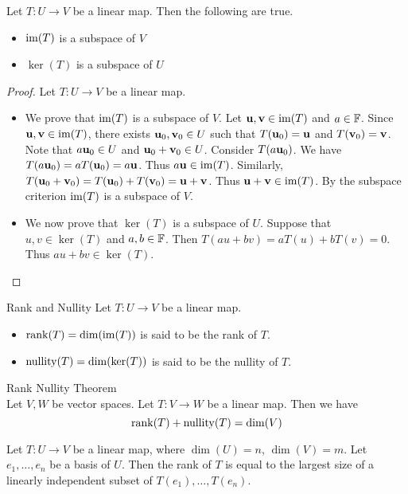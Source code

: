 \documentclass[a4paper]{article}
\begin{document}
\begin{prp}{}{} Let $T:U\to V$ be a linear map. Then the following are true. 
\begin{itemize}
\item $\operatorname{im}(T)$ is a subspace of $V$
\item $\ker(T)$ is a subspace of $U$
\end{itemize}
\begin{proof} Let $T:U\to V$ be a linear map. 
\begin{itemize}
\item We prove that $\operatorname{im}(T)$ is a subspace of $V$. Let $\vb{u},\vb{v}\in\operatorname{im}(T)$ and $a\in\mathbb{F}$. Since $\vb{u},\vb{v}\in\operatorname{im}(T)$, there exists $\vb{u}_0,\vb{v}_0\in U$ such that $T(\vb{u}_0)=\vb{u}$ and $T(\vb{v}_0)=\vb{v}$. Note that $a\vb{u}_0\in U$ and $\vb{u}_0+\vb{v}_0\in U$. Consider $T(a\vb{u}_0)$. We have $T(a\vb{u}_0)=aT(\vb{u}_0)=a\vb{u}$. Thus $a\vb{u}\in\operatorname{im}(T)$. Similarly, $T(\vb{u}_0+\vb{v}_0)=T(\vb{u}_0)+T(\vb{v}_0)=\vb{u}+\vb{v}$. Thus $\vb{u}+\vb{v}\in\operatorname{im}(T)$. By the subspace criterion $\operatorname{im}(T)$ is a subspace of $V$. 
\item We now prove that $\ker(T)$ is a subspace of $U$. Suppose that $u,v\in\ker(T)$ and $a,b\in\mathbb{F}$. Then $T(au+bv)=aT(u)+bT(v)=0$. Thus $au+bv\in\ker(T)$. 
\end{itemize}
\end{proof}
\end{prp}

\begin{defn}{Rank and Nullity}{} Let $T:U\to V$ be a linear map. 
\begin{itemize}
\item $\rank(T)=\dim(\operatorname{im}(T))$ is said to be the rank of $T$. 
\item $\operatorname{nullity}(T)=\dim(\ker(T))$ is said to be the nullity of $T$. 
\end{itemize}
\end{defn}

\begin{thm}{Rank Nullity Theorem}{}\\
Let $V,W$ be vector spaces. Let $T:V\to W$ be a linear map. Then we have $$\rank(T)+\operatorname{nullity}(T)=\dim(V)$$
\end{thm}

\begin{thm}{}{} Let $T:U\to V$ be a linear map, where $\dim(U)=n$, $\dim(V)=m$. Let $e_1,\dots,e_n$ be a basis of $U$. Then the rank of $T$ is equal to the largest size of a linearly independent subset of $T(e_1),\dots,T(e_n)$. 
\end{thm}
\end{document}
